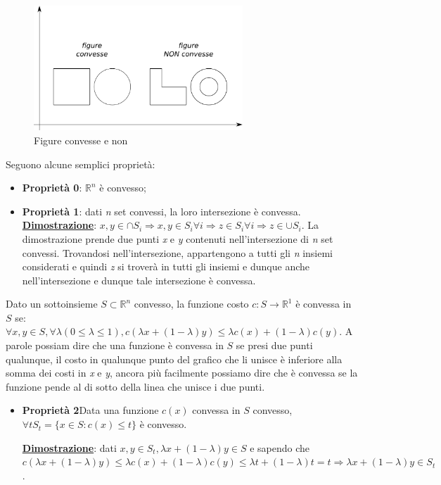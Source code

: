 \documentclass[11pt]{book}
\begin{document}
\begin{figure}[h!]
  \centering
  \includegraphics[width=0.7\textwidth]{images/convessita.png}
  \caption{Figure convesse e non}
  \label{convessita}
\end{figure}

Seguono alcune semplici propriet\`a:

\begin{itemize}
\item {\bf Propriet\`a 0}: $\mathbb{R}^n$ \`e convesso;
\item {\bf Propriet\`a 1}: dati {\em n} set convessi, la loro
  intersezione \`e convessa.
  {\bf \underline{Dimostrazione}}: $x, y \in \cap S_i \Rightarrow x,y
  \in S_i \forall i \Rightarrow z \in S_i \forall i \Rightarrow z \in
  \cup S_i$.
  La dimostrazione prende due punti {\em x} e {\em y} contenuti
  nell'intersezione di {\em n} set convessi. Trovandosi
  nell'intersezione, appartengono a tutti gli {\em n} insiemi
  considerati e quindi {\em z} si trover\`a in tutti gli insiemi e
  dunque anche nell'intersezione e dunque tale intersezione \`e
  convessa.
\end{itemize}

Dato un sottoinsieme $S \subset \mathbb{R}^n$ convesso, la funzione
costo $c:S\rightarrow \mathbb{R}^1$ \`e convessa in $S$ se: $\forall
x,y \in S, \forall \lambda(0 \leq \lambda \leq 1), c(\lambda x +
(1-\lambda)y) \leq \lambda c(x) + (1-\lambda)c(y)$. A parole possiam
dire che una funzione \`e convessa in $S$ se presi due punti
qualunque, il costo in qualunque punto del grafico che li unisce \`e
inferiore alla somma dei costi in {\em x} e {\em y}, ancora pi\`u
facilmente possiamo dire che \`e convessa se la funzione pende al di
sotto della linea che unisce i due punti.


\begin{itemize}
\item {\bf Propriet\`a 2}Data una funzione $c(x)$ convessa in $S$
  convesso, $\forall t S_t = \{x\in S : c(x) \leq t\}$ \`e convesso.
    
    {\bf \underline{Dimostrazione}}: dati $x,y \in S_t, \lambda x +
    (1-\lambda)y\in S$ e sapendo che $c(\lambda x+ (1-\lambda)y) \leq
    \lambda c(x) + (1-\lambda)c(y) \leq \lambda t + (1-\lambda)t = t
    \Rightarrow \lambda x+ (1-\lambda)y \in S_t$.
\end{itemize}
\end{document}
